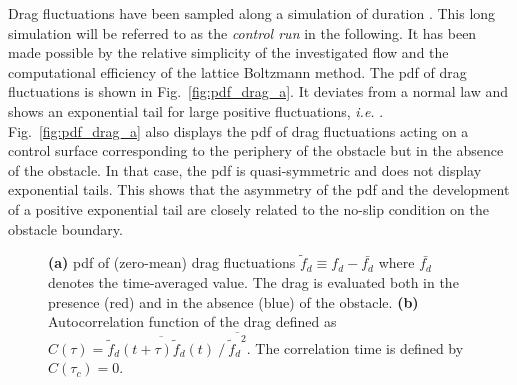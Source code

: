\documentclass{jfm}
\newcommand{\EL}[1]{{\color{myred}{#1}}}
\begin{document}
Drag fluctuations have been sampled along a simulation of duration \EL{$T_{tot} = 4\times 10^6~T_0$}.
This long simulation will be referred to as the \textit{control run} in the following.
It has been made possible by the relative simplicity of the investigated flow and the computational efficiency of the lattice Boltzmann method.
The \ac{pdf} of drag fluctuations is shown in Fig.~\ref{fig:pdf_drag_a}.
It deviates from a normal law and shows an exponential tail for large positive fluctuations, \textit{i.e.}  \EL{${\mathbb{P}}(f_d) \propto e^{-\ell f_d}$}.
%
Fig.~\ref{fig:pdf_drag_a} also displays the \ac{pdf} of drag fluctuations acting on a control surface corresponding to the periphery of the obstacle but in the absence of the obstacle.
%
In that case, the \ac{pdf} is quasi-symmetric and does not display exponential tails. This shows that the asymmetry of the \ac{pdf} and the development of a positive exponential tail are closely related to the no-slip condition on the obstacle boundary.
\begin{figure}
	\centering
	\caption{\textbf{(a)} \ac{pdf} of (zero-mean) drag fluctuations $\tilde f_d \equiv f_d - \bar{f_d}$ where $\bar{f_d}$ denotes the time-averaged value. The drag is evaluated both in the presence (red) and in the absence (blue) of the obstacle. %
		\textbf{(b)} Autocorrelation function of the drag defined as $C(\tau) = \overline{ \tilde f_d(t+\tau)\tilde f_d(t)} ~/~ \overline{{\tilde f_d}^2}$. The correlation time \EL{$\tau_c\simeq 4 T_0$} is defined by $C(\tau_c)=0$.
	}
	\label{fig:pdf_drag}
\end{figure}
\end{document}
